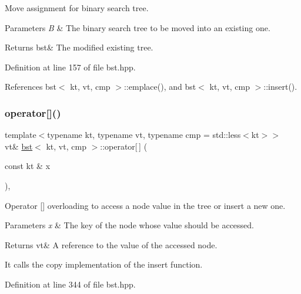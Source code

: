 Move assignment for binary search tree. 


\begin{DoxyParams}{Parameters}
{\em B} & The binary search tree to be moved into an existing one. \\
\hline
\end{DoxyParams}
\begin{DoxyReturn}{Returns}
bst\& The modified existing tree. 
\end{DoxyReturn}


Definition at line 157 of file bst.\+hpp.



References bst$<$ kt, vt, cmp $>$\+::emplace(), and bst$<$ kt, vt, cmp $>$\+::insert().

\mbox{\label{classbst_ae9b1b8ff05ece0ac05e8dfca244e556e}} 
\subsubsection{\texorpdfstring{operator[]()}{operator[]()}\hspace{0.1cm}{\footnotesize\ttfamily [1/2]}}
{\footnotesize\ttfamily template$<$typename kt, typename vt, typename cmp = std\+::less$<$kt$>$$>$ \\
vt\& \hyperlink{classbst}{bst}$<$ kt, vt, cmp $>$\+::operator\mbox{[}$\,$\mbox{]} (\begin{DoxyParamCaption}\item[{const kt \&}]{x }\end{DoxyParamCaption})\hspace{0.3cm}{\ttfamily [inline]}, {\ttfamily [noexcept]}}



Operator \mbox{[}\mbox{]} overloading to access a node value in the tree or insert a new one. 


\begin{DoxyParams}{Parameters}
{\em x} & The key of the node whose value should be accessed. \\
\hline
\end{DoxyParams}
\begin{DoxyReturn}{Returns}
vt\& A reference to the value of the accessed node.
\end{DoxyReturn}
It calls the copy implementation of the insert function. 

Definition at line 344 of file bst.\+hpp.



